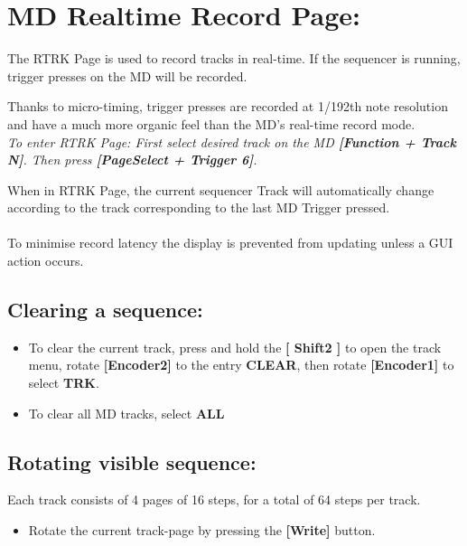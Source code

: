\chapter{MD Realtime Record Page:}

The RTRK Page is used to record tracks in real-time. If the sequencer is running, trigger presses on the MD will be recorded.

Thanks to micro-timing, trigger presses are recorded at 1/192th note resolution and have a much more organic feel than the MD’s real-time record mode.
\\
\textit{To enter RTRK Page: First select desired track on the MD \textbf{[Function + Track N]}. Then press \textbf{[PageSelect + Trigger 6]}.}


When in RTRK Page, the current sequencer Track will automatically change according to the track corresponding to the last MD Trigger pressed.\\
\\To minimise record latency the display is prevented from updating unless a GUI action occurs. 


\section{Clearing a sequence:}
\begin{itemize}
\item To clear the current track, press and hold the\textbf{ [ Shift2 ]} to open the track menu, rotate \textbf{[Encoder2]} to the entry \textbf{CLEAR}, then rotate \textbf{[Encoder1]} to select \textbf{TRK}.
\item To clear all MD tracks, select \textbf{ALL}
\end{itemize}

\vspace{-0.3cm}

\section{Rotating visible sequence:}
Each track consists of 4 pages of 16 steps, for a total of 64 steps per track.
\begin{itemize}
\item Rotate the current track-page by pressing the \textbf{[Write] }button.
\end{itemize}

